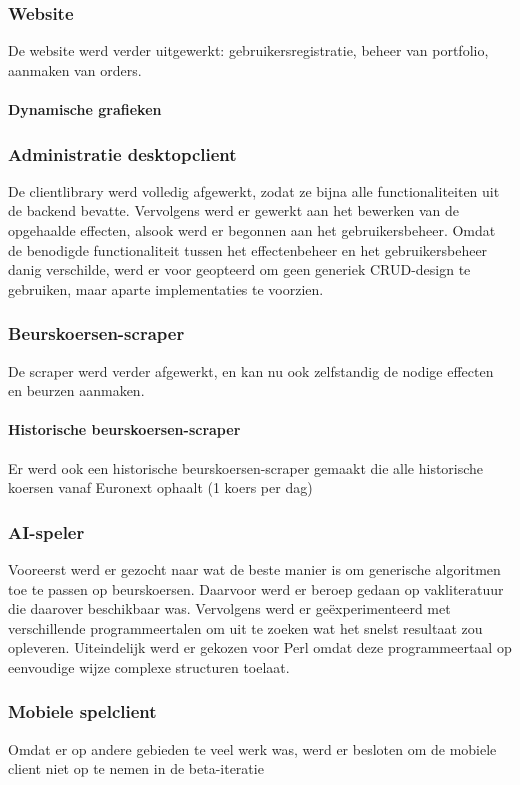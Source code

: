 \subsubsection{Website}
De website werd verder uitgewerkt: gebruikersregistratie, beheer van portfolio, aanmaken van orders.
\paragraph{Dynamische grafieken}

\subsubsection{Administratie desktopclient}
De clientlibrary werd volledig afgewerkt, zodat ze bijna alle functionaliteiten uit de backend bevatte.
Vervolgens werd er gewerkt aan het bewerken van de opgehaalde effecten, alsook werd er begonnen aan het gebruikersbeheer. Omdat de benodigde functionaliteit tussen het effectenbeheer en het gebruikersbeheer danig verschilde, werd er voor geopteerd om geen generiek CRUD-design te gebruiken, maar aparte implementaties te voorzien.

\subsubsection{Beurskoersen-scraper}
De scraper werd verder afgewerkt, en kan nu ook zelfstandig de nodige effecten en beurzen aanmaken.
\paragraph{Historische beurskoersen-scraper}
Er werd ook een historische beurskoersen-scraper gemaakt die alle historische koersen vanaf Euronext ophaalt (1 koers per dag)

\subsubsection{AI-speler}
Vooreerst werd er gezocht naar wat de beste manier is om generische algoritmen toe te passen op beurskoersen. Daarvoor werd er beroep gedaan op vakliteratuur die daarover beschikbaar was. Vervolgens werd er ge\"experimenteerd met verschillende programmeertalen om uit te zoeken wat het snelst resultaat zou opleveren. Uiteindelijk werd er gekozen voor Perl omdat deze programmeertaal op eenvoudige wijze complexe structuren toelaat.

\subsubsection{Mobiele spelclient}
Omdat er op andere gebieden te veel werk was, werd er besloten om de mobiele client niet op te nemen in de beta-iteratie

